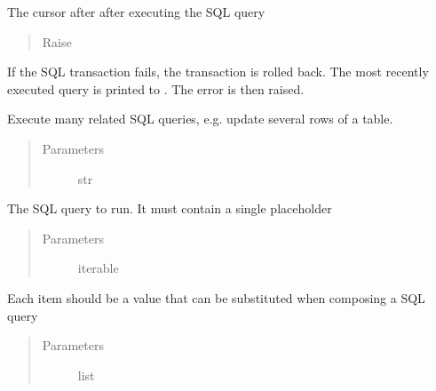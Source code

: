 \documentclass[letterpaper,10pt,english]{sphinxmanual}
\begin{document}
\begin{fulllineitems}
\begin{fulllineitems}
\begin{quote}
\begin{description}
\end{description}\end{quote}

The cursor after after executing the SQL query
\begin{quote}\begin{description}
\item[{Raise}] \leavevmode
{}

\end{description}\end{quote}

If the SQL transaction fails, the transaction is rolled back. The most 
recently executed query is printed to . The error is then 
raised.

\end{fulllineitems}


\begin{fulllineitems}
\label{\detokenize{tiger_leagues/models/readme:tiger_leagues.models.db_model.Database.execute_many}}
Execute many related SQL queries, e.g. update several rows of a table.
\begin{quote}\begin{description}
\item[{Parameters}] \leavevmode
{} \textendash{} str

\end{description}\end{quote}

The SQL query to run. It must contain a single  placeholder
\begin{quote}\begin{description}
\item[{Parameters}] \leavevmode
{} \textendash{} iterable

\end{description}\end{quote}

Each item should be a value that can be substituted when composing a 
SQL query
\begin{quote}\begin{description}
\item[{Parameters}] \leavevmode
{} \textendash{} list


\end{description}
\end{quote}
\end{fulllineitems}
\end{fulllineitems}
\end{document}
